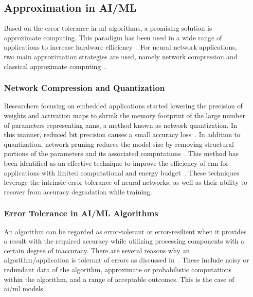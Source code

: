 \subsection{Approximation in AI/ML}
Based on the error tolerance in \gls{ml} algorithms, a promising solution is approximate computing. This paradigm has been used in a wide range of applications to increase hardware efficiency~\cite{han2013approximate}. For neural network applications, two main approximation strategies are used, namely network compression and classical approximate computing~\cite{bouvier2019spiking}.

\subsubsection{Network Compression and Quantization}
Researchers focusing on embedded applications started lowering the precision of weights and activation maps to shrink the memory footprint of the large number of parameters representing \glspl{ann}, a method known as network quantization. In this manner, reduced bit precision causes a small accuracy loss~\cite{courbariaux2015binaryconnect, han2015deep, hubara2017quantized, rastegari2016xnor}. In addition to quantization, network pruning reduces the model size by removing structural portions of the parameters and its associated computations~\cite{lecun1989optimal,hassibi1992second}. This method has been identified as an effective technique to improve the efficiency of \gls{cnn} for applications with limited computational and energy  budget~\cite{molchanov2016pruning,li2016pruning, liu2018rethinking}. These techniques leverage the intrinsic error-tolerance of neural networks, as well as their ability to recover from accuracy degradation while training.

\subsubsection{Error Tolerance in AI/ML Algorithms}
An algorithm can be regarded as error-tolerant or error-resilient when it provides a result with the required accuracy while utilizing processing components with a certain degree of inaccuracy. There are several reasons why an algorithm/application is tolerant of errors as discussed in~\cite{chippa2013analysis}. These include noisy or redundant data of the algorithm, approximate or probabilistic computations within the algorithm, and a range of acceptable outcomes. This is the case of \gls{ai}/\gls{ml} models.


